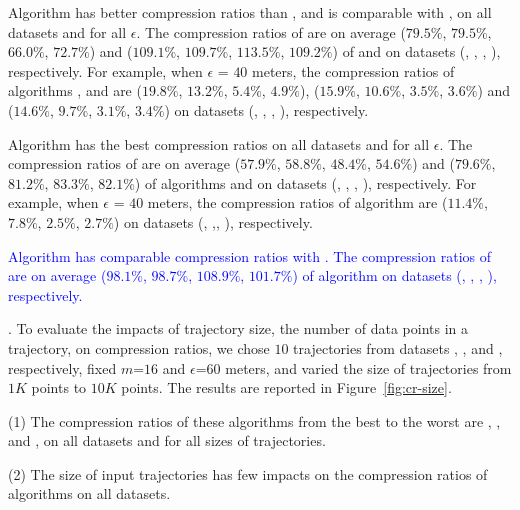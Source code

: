  Algorithm \cist has better compression ratios than \squishe, and is {comparable} with \dps, on all datasets and for all $\epsilon$.
The compression ratios of \cist are on average {($79.5\%$, $79.5\%$, $66.0\%$,
$72.7\%$)  and ($109.1\%$, $109.7\%$, $113.5\%$, $109.2\%$)} of \squishe and
\dps on {datasets (\sercar, \geolife, \mopsi, \pricar)}, respectively.
For example, when $\epsilon$ = $40$ meters, the compression ratios of algorithms
\squishe, \cist and \dps are {($19.8\%$, $13.2\%$, $5.4\%$, $4.9\%$), ($15.9\%$,
$10.6\%$, $3.5\%$, $3.6\%$) and ($14.6\%$, $9.7\%$, $3.1\%$, $3.4\%$)} on  {datasets (\sercar, \geolife, \mopsi, \pricar)}, respectively.

 Algorithm \cista has {the best} compression ratios on all datasets and for all $\epsilon$.
The compression ratios of \cista are on average ($57.9\%$, $58.8\%$, $48.4\%$,
$54.6\%$) and ($79.6\%$, $81.2\%$, $83.3\%$, $82.1\%$) of algorithms
\squishe and \dps  on {datasets (\sercar, \geolife, \mopsi, \pricar)}, respectively.
For example, when $\epsilon$ = $40$ meters, the compression ratios of algorithm
\cista are ($11.4\%$, $7.8\%$, $2.5\%$, $2.7\%$) on datasets (\sercar, \geolife,\mopsi, \pricar), respectively.

\textcolor{blue}{
 Algorithm \cista has {comparable} compression ratios with \cisto.
The compression ratios of \cista are on average ($98.1\%$, $98.7\%$, $108.9\%$, $101.7\%$)  
of algorithm \cisto on datasets (\sercar, \geolife, \mopsi, \pricar), respectively.
}

.
To evaluate the impacts of trajectory size, \ie the number of data points in a trajectory, on compression ratios,
we chose {$10$} trajectories from {datasets \sercar, \geolife, \mopsi and \pricar}, respectively,
fixed {$m$=$16$} and $\epsilon$=$60$ meters, and varied the size  of trajectories from $1K$ points to $10K$ points.
%
The results are reported in Figure~\ref{fig:cr-size}.

\ni(1) The compression ratios of these algorithms from the best to the worst are \cista, \dps, \cist and \squishe, on all datasets and for all sizes of trajectories. %

\ni(2) The size of input trajectories has few impacts on the compression ratios of \lsa algorithms on all datasets.





